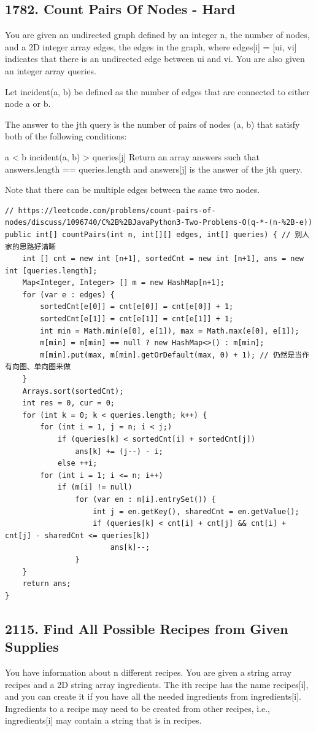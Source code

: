\documentclass[9pt, b5paaper]{book}
\begin{document}
\subsection{1782. Count Pairs Of Nodes - Hard}
\label{sec-1-1-7}
You are given an undirected graph defined by an integer n, the number of nodes, and a 2D integer array edges, the edges in the graph, where edges[i] = [ui, vi] indicates that there is an undirected edge between ui and vi. You are also given an integer array queries.

Let incident(a, b) be defined as the number of edges that are connected to either node a or b.

The answer to the jth query is the number of pairs of nodes (a, b) that satisfy both of the following conditions:

a < b
incident(a, b) > queries[j]
Return an array answers such that answers.length == queries.length and answers[j] is the answer of the jth query.

Note that there can be multiple edges between the same two nodes.
\begin{verbatim}
// https://leetcode.com/problems/count-pairs-of-nodes/discuss/1096740/C%2B%2BJavaPython3-Two-Problems-O(q-*-(n-%2B-e))
public int[] countPairs(int n, int[][] edges, int[] queries) { // 别人家的思路好清晰
    int [] cnt = new int [n+1], sortedCnt = new int [n+1], ans = new int [queries.length];
    Map<Integer, Integer> [] m = new HashMap[n+1];
    for (var e : edges) {
        sortedCnt[e[0]] = cnt[e[0]] = cnt[e[0]] + 1;
        sortedCnt[e[1]] = cnt[e[1]] = cnt[e[1]] + 1;
        int min = Math.min(e[0], e[1]), max = Math.max(e[0], e[1]);
        m[min] = m[min] == null ? new HashMap<>() : m[min];
        m[min].put(max, m[min].getOrDefault(max, 0) + 1); // 仍然是当作有向图、单向图来做
    }
    Arrays.sort(sortedCnt);
    int res = 0, cur = 0;
    for (int k = 0; k < queries.length; k++) {
        for (int i = 1, j = n; i < j;) 
            if (queries[k] < sortedCnt[i] + sortedCnt[j])
                ans[k] += (j--) - i;
            else ++i;
        for (int i = 1; i <= n; i++) 
            if (m[i] != null) 
                for (var en : m[i].entrySet()) {
                    int j = en.getKey(), sharedCnt = en.getValue();
                    if (queries[k] < cnt[i] + cnt[j] && cnt[i] + cnt[j] - sharedCnt <= queries[k])
                        ans[k]--;
                }
    } 
    return ans;
}
\end{verbatim}

\subsection{2115. Find All Possible Recipes from Given Supplies}
\label{sec-1-1-8}
You have information about n different recipes. You are given a string array recipes and a 2D string array ingredients. The ith recipe has the name recipes[i], and you can create it if you have all the needed ingredients from ingredients[i]. Ingredients to a recipe may need to be created from other recipes, i.e., ingredients[i] may contain a string that is in recipes.
\end{document}
